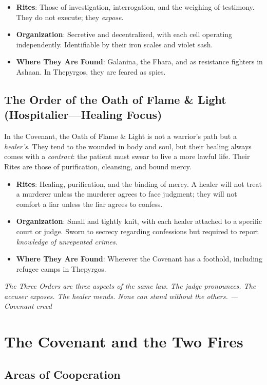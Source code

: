 \documentclass{book}
\newcommand{\citation}[1]{\textcolor{marginalia}{\small\textit{#1}}}
\begin{document}
\begin{itemize}
\item \textbf{Rites}: Those of investigation, interrogation, and the weighing of testimony. They do not execute; they \textit{expose}.
\item \textbf{Organization}: Secretive and decentralized, with each cell operating independently. Identifiable by their iron scales and violet sash.
\item \textbf{Where They Are Found}: Galanina, the Fhara, and as resistance fighters in Ashaan. In Thepyrgos, they are feared as spies.
\end{itemize}

\section{The Order of the Oath of Flame \& Light (Hospitalier---Healing Focus)}

In the Covenant, the Oath of Flame \& Light is not a warrior's path but a \textit{healer's}. They tend to the wounded in body and soul, but their healing always comes with a \textit{contract}: the patient must swear to live a more lawful life. Their Rites are those of purification, cleansing, and bound mercy.

\begin{itemize}
\item \textbf{Rites}: Healing, purification, and the binding of mercy. A healer will not treat a murderer unless the murderer agrees to face judgment; they will not comfort a liar unless the liar agrees to confess.
\item \textbf{Organization}: Small and tightly knit, with each healer attached to a specific court or judge. Sworn to secrecy regarding confessions but required to report \textit{knowledge of unrepented crimes}.
\item \textbf{Where They Are Found}: Wherever the Covenant has a foothold, including refugee camps in Thepyrgos.
\end{itemize}

\citation{The Three Orders are three aspects of the same law. The judge pronounces. The accuser exposes. The healer mends. None can stand without the others. --- Covenant creed}

\chapter{The Covenant and the Two Fires}

\section{Areas of Cooperation}
\end{document}
